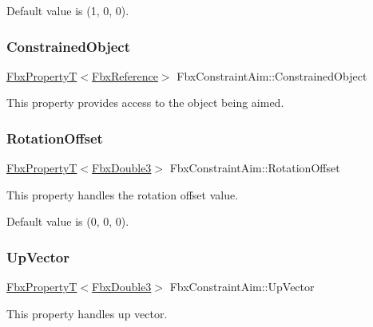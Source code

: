 Default value is (1, 0, 0). \mbox{\label{class_fbx_constraint_aim_ae1e8704e4e04529a254e91080a2a19c1}} 
\subsubsection{\texorpdfstring{Constrained\+Object}{ConstrainedObject}}
{\footnotesize\ttfamily \hyperlink{class_fbx_property_t}{Fbx\+PropertyT}$<$\hyperlink{fbxtypes_8h_a44df6a2eec915cf27cd481e5c5e48a24}{Fbx\+Reference}$>$ Fbx\+Constraint\+Aim\+::\+Constrained\+Object}

This property provides access to the object being aimed. \mbox{\label{class_fbx_constraint_aim_a2eff91c699e2dd2391f650a5659f1e5e}} 
\subsubsection{\texorpdfstring{Rotation\+Offset}{RotationOffset}}
{\footnotesize\ttfamily \hyperlink{class_fbx_property_t}{Fbx\+PropertyT}$<$\hyperlink{fbxtypes_8h_ae0a96f14cde566774c7553aa7523b7a7}{Fbx\+Double3}$>$ Fbx\+Constraint\+Aim\+::\+Rotation\+Offset}

This property handles the rotation offset value.

Default value is (0, 0, 0). \mbox{\label{class_fbx_constraint_aim_a6c92f45b498fd1f214cde79f84ffc9c7}} 
\subsubsection{\texorpdfstring{Up\+Vector}{UpVector}}
{\footnotesize\ttfamily \hyperlink{class_fbx_property_t}{Fbx\+PropertyT}$<$\hyperlink{fbxtypes_8h_ae0a96f14cde566774c7553aa7523b7a7}{Fbx\+Double3}$>$ Fbx\+Constraint\+Aim\+::\+Up\+Vector}

This property handles up vector.

